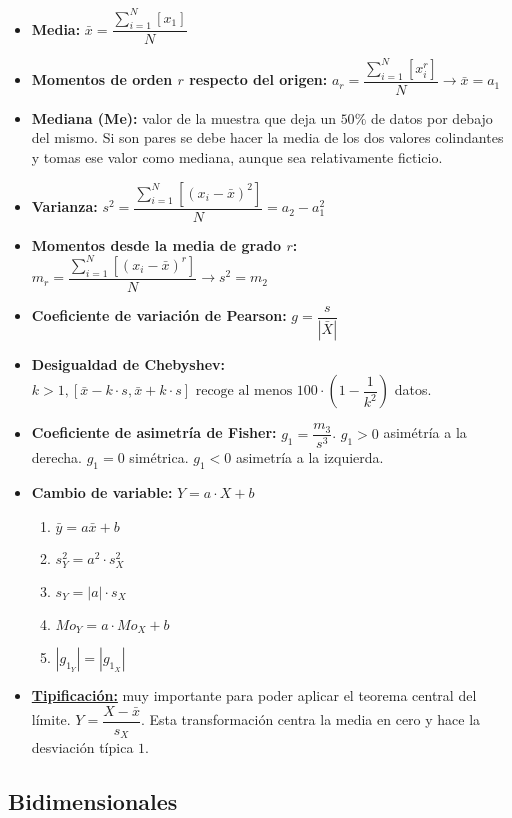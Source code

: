 \documentclass[a4paper, twocolumn, 10pt]{article}
\begin{document}
\begin{itemize}
	\item \textbf{Media:} $\bar{x} = \dfrac{\sum\limits_{i=1}^{N}\left[x_1\right]}{N}$
	\item \textbf{Momentos de orden $r$ respecto del origen:} $a_r = \dfrac{\sum\limits_{i=1}^{N}\left[x_i^r\right]}{N}
	\rightarrow \bar{x} = a_1$
	\item \textbf{Mediana (Me):} valor de la muestra que deja un $50\%$ de datos por debajo del mismo. Si son pares se debe hacer la media de los dos valores colindantes y tomas ese valor como mediana, aunque sea relativamente ficticio.
	\item \textbf{Varianza:} $s^2 = \dfrac{\sum\limits_{i=1}^{N}\left[\left(x_i - \bar{x}\right)^2\right]}{N} = a_2 - a_1^2$
	\item \textbf{Momentos desde la media de grado $r$:} $m_r = \dfrac{\sum\limits_{i=1}^{N}\left[\left(x_i - \bar{x}\right)^r\right]}{N} \rightarrow s^2 = m_2$
	\item \textbf{Coeficiente de variación de Pearson:} $g = \dfrac{s}{|\bar{X}|}$
	\item \textbf{Desigualdad de Chebyshev:} \\ $k>1,\left[\bar{x} -k\cdot s,\bar{x} +k\cdot s \right] \text{ recoge al menos } 100\cdot\left(1-\dfrac{1}{k^2}\right)$ datos.
	\item \textbf{Coeficiente de asimetría de Fisher:} $g_1 = \dfrac{m_3}{s^3}$. $g_1>0$ asimétría a la derecha. $g_1=0$ simétrica. $g_1<0$ asimetría a la izquierda.
	\item \textbf{Cambio de variable:} $Y = a\cdot X + b$
	\begin{enumerate}
		\item $\bar{y} = a\bar{x} + b$
		\item $s_Y^2 = a^2 \cdot s_X^2$
		\item $s_Y = |a|\cdot s_X$
		\item $Mo_Y = a\cdot Mo_X + b$
		\item $|g_{1_Y}| = |g_{1_X}|$
	\end{enumerate}
	\item \textbf{\underline{Tipificación:}} muy importante para poder aplicar el teorema central del límite. $Y =  \dfrac{X-\bar{x}}{s_X}$. Esta transformación centra la media en cero y hace la desviación típica $1$.
\end{itemize}

\subsection{Bidimensionales}
\end{document}

